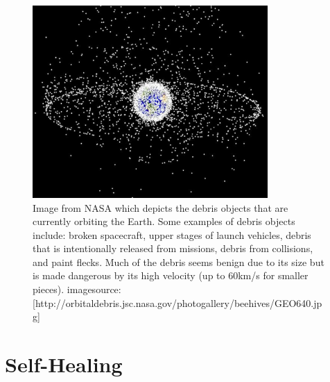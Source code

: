 \begin{figure}[ht!]
\centering
\includegraphics[width=0.8\textwidth]{eps_pics/orbitalDebris}
\caption{ Image from NASA which depicts the debris objects that are currently orbiting the Earth. Some examples of debris objects include: broken spacecraft, upper stages of launch vehicles, debris that is intentionally released from missions, debris from collisions, and paint flecks. Much of the debris seems benign due to its size but is made dangerous by its high velocity (up to 60km/s for smaller pieces).
\newline
imagesource:[http://orbitaldebris.jsc.nasa.gov/photogallery/beehives/GEO640.jpg]
	 \label{fig:orbitalDebris}} 
\end{figure}

\section{Self-Healing}

